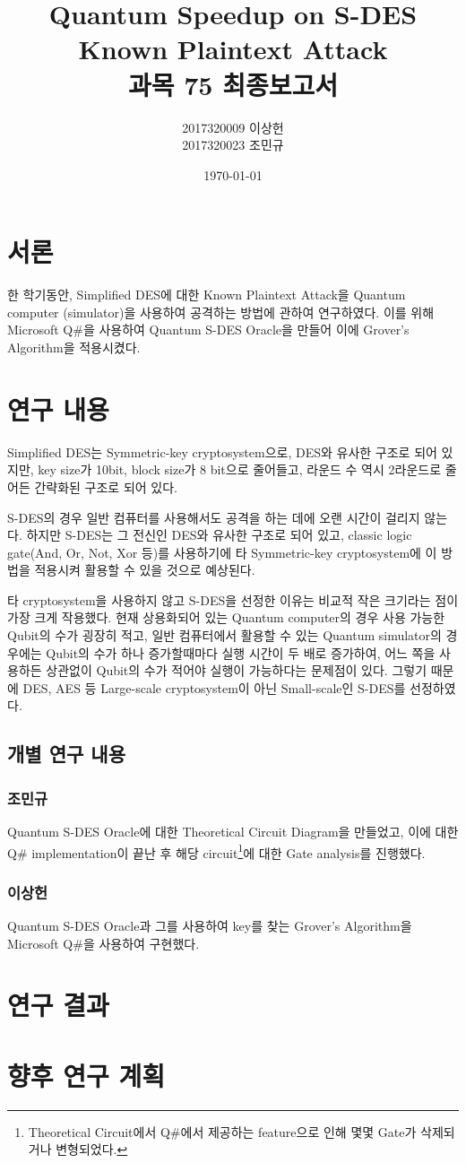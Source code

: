\documentclass{article}
\title{Quantum Speedup on S-DES Known Plaintext Attack\\\large 과목 75 최종보고서}
\author{2017320009 이상헌\\2017320023 조민규}
\date{\today}
\theoremstyle{break}
\begin{document}
	\maketitle
	
	\section{서론}
	
	한 학기동안, Simplified DES에 대한 Known Plaintext Attack을 Quantum computer (simulator)을 사용하여 공격하는 방법에 관하여 연구하였다. 이를 위해 Microsoft Q\#을 사용하여 Quantum S-DES Oracle을 만들어 이에 Grover’s Algorithm을 적용시켰다.
	
	\section{연구 내용}
	
	Simplified DES는 Symmetric-key cryptosystem으로, DES와 유사한 구조로 되어 있지만, key size가 10bit, block size가 8 bit으로 줄어들고, 라운드 수 역시 2라운드로 줄어든 간략화된 구조로 되어 있다.
	
	S-DES의 경우 일반 컴퓨터를 사용해서도 공격을 하는 데에 오랜 시간이 걸리지 않는다. 하지만 S-DES는 그 전신인 DES와 유사한 구조로 되어 있고, classic logic gate(And, Or, Not, Xor 등)를 사용하기에 타 Symmetric-key cryptosystem에 이 방법을 적용시켜 활용할 수 있을 것으로 예상된다.
	
	타 cryptosystem을 사용하지 않고 S-DES을 선정한 이유는 비교적 작은 크기라는 점이 가장 크게 작용했다. 현재 상용화되어 있는 Quantum computer의 경우 사용 가능한 Qubit의 수가 굉장히 적고, 일반 컴퓨터에서 활용할 수 있는 Quantum simulator의 경우에는 Qubit의 수가 하나 증가할때마다 실행 시간이 두 배로 증가하여, 어느 쪽을 사용하든 상관없이 Qubit의 수가 적어야 실행이 가능하다는 문제점이 있다. 그렇기 때문에 DES, AES 등 Large-scale cryptosystem이 아닌 Small-scale인 S-DES를 선정하였다.
	
	\subsection{개별 연구 내용}
	
	\subsubsection{조민규}
	
	Quantum S-DES Oracle에 대한 Theoretical Circuit Diagram을 만들었고, 이에 대한 Q\# implementation이 끝난 후 해당 circuit\footnote{Theoretical Circuit에서 Q\#에서 제공하는 feature으로 인해 몇몇 Gate가 삭제되거나 변형되었다.}에 대한 Gate analysis를 진행했다.
	
	\subsubsection{이상헌}
	
	Quantum S-DES Oracle과 그를 사용하여 key를 찾는 Grover's Algorithm을 Microsoft Q\#을 사용하여 구현했다.
	
	\section{연구 결과}
	
	
	
	\section{향후 연구 계획}
	
\end{document}
